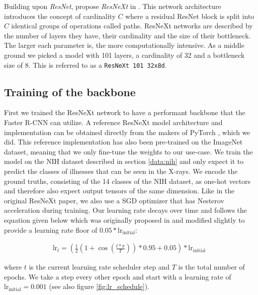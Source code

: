 Building upon \textit{ResNet}, \citeauthor{xie_aggregated_2017} propose \textit{ResNeXt} in \autocite{xie_aggregated_2017}. This network architecture introduces the concept of cardinality $C$ where a residual ResNet block is split into $C$ identical groups of operations called paths. ResNeXt networks are described by the number of layers they have, their cardinality and the size of their bottleneck. The larger each parameter is, the more computationally intensive. As a middle ground we picked a model with 101 layers, a cardinality of 32 and a bottleneck size of 8. This is referred to as a \texttt{ResNeXt 101 32x8d}.

\subsection*{Training of the backbone}

First we trained the ResNeXt network to have a performant backbone that the Faster \ac{R-CNN} can utilize. A reference ResNeXt model architecture and implementation can be obtained directly from the makers of PyTorch \autocite{pytorch_team_resnext_nodate}, which we did. This reference implementation has also been pre-trained on the ImageNet dataset, meaning that we only fine-tune the weights to our use-case. We train the model on the NIH dataset described in section \vref{data:nih} and only expect it to predict the classes of illnesses that can be seen in the X-rays. We encode the ground truths, consisting of the 14 classes of the NIH dataset, as one-hot vectors and therefore also expect output tensors of the same dimension. Like in the original ResNeXt paper, we also use a \acf{SGD} optimizer that has Nesterov acceleration during training. Our learning rate decays over time and follows the equation given below which was originally proposed in \autocite{he_bag_2018} and modified slightly to provide a learning rate floor of $0.05 * \text{lr}_\text{initial}$: 

\begin{align}\label{eq:scheduler}
\text{lr}_t = \left(\frac{1}{2}\left(1 + \cos\left(\frac{t * \pi}{T}\right)\right) * 0.95 + 0.05\right) * \text{lr}_\text{initial}
\end{align}

where $t$ is the current learning rate scheduler step and $T$ is the total number of epochs. We take a step every other epoch and start with a learning rate of $\text{lr}_\text{initial} = 0.001$ (see also figure \ref{fig:lr_schedule}).

